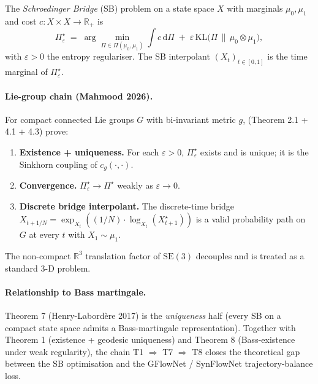 The \emph{Schroedinger Bridge} (SB) problem on a state space $X$
with marginals $\mu_{0}, \mu_{1}$ and cost $c : X \times X \to
\mathbb{R}_{+}$ is
\begin{equation}
  \label{eq:sb-def}
  \Pi^{\star}_{\varepsilon} \;=\; \arg\min_{\Pi \in \Pi(\mu_{0}, \mu_{1})}
        \int c \,\mathrm{d}\Pi \;+\; \varepsilon \,
        \mathrm{KL}\!\bigl( \Pi \,\|\, \mu_{0} \otimes \mu_{1} \bigr),
\end{equation}
with $\varepsilon > 0$ the entropy regulariser.  The SB
interpolant $(X_{t})_{t \in [0, 1]}$ is the time marginal of
$\Pi^{\star}_{\varepsilon}$.

\paragraph{Lie-group chain (Mahmood 2026).}
For compact connected Lie groups $G$ with bi-invariant metric $g$,
\cite{mahmood2026sb_lie} (Theorem 2.1 + 4.1 + 4.3) prove:
\begin{enumerate}
  \item[(i)] \textbf{Existence + uniqueness.}  For each
    $\varepsilon > 0$, $\Pi^{\star}_{\varepsilon}$ exists and is
    unique; it is the Sinkhorn coupling of $c_{g}(\cdot, \cdot)$.
  \item[(ii)] \textbf{Convergence.}  $\Pi^{\star}_{\varepsilon}
    \to \Pi^{\star}$ weakly as $\varepsilon \to 0$.
  \item[(iii)] \textbf{Discrete bridge interpolant.}  The
    discrete-time bridge
    $X_{t + 1/N} = \exp_{X_{t}}( (1/N) \cdot \log_{X_{t}}(X^{\star}_{t+1}) )$
    is a valid probability path on $G$ at every $t$ with
    $X_{1} \sim \mu_{1}$.
\end{enumerate}
The non-compact $\mathbb{R}^{3}$ translation factor of
$\mathrm{SE}(3)$ decouples and is treated as a standard 3-D
problem.

\paragraph{Relationship to Bass martingale.}
Theorem 7 (Henry-Labord\`ere 2017) is the \emph{uniqueness} half
(every SB on a compact state space admits a Bass-martingale
representation).  Together with Theorem 1 (existence + geodesic
uniqueness) and Theorem 8 (Bass-existence under weak regularity),
the chain \textsc{T1} $\Rightarrow$ \textsc{T7} $\Rightarrow$
\textsc{T8} closes the theoretical gap between the SB
optimisation and the GFlowNet / SynFlowNet trajectory-balance
loss.


